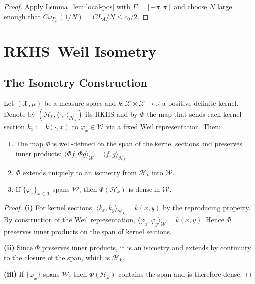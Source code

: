 \begin{proof}
Apply Lemma~\ref{lem:local-pos} with $\Gamma = [-\pi, \pi]$ and choose $N$ large enough that $C \omega_{P_A}(1/N) = C L_A / N \leq c_0/2$.
\end{proof}

\section{RKHS--Weil Isometry}\label{app:rkhs-weil}

\subsection{The Isometry Construction}

\begin{lemma}\label{lem:rkhs-weil-iso}
Let $(\mathcal{X}, \mu)$ be a measure space and $k: \mathcal{X} \times \mathcal{X} \to \mathbb{R}$ a positive-definite kernel. Denote by $(\mathcal{H}_k, \langle \cdot, \cdot \rangle_{\mathcal{H}_k})$ its RKHS and by $\Phi$ the map that sends each kernel section $k_x := k(\cdot, x)$ to $\varphi_x \in \mathcal{W}$ via a fixed Weil representation. Then:
\begin{enumerate}
  \item[\textup{(i)}] The map $\Phi$ is well-defined on the span of the kernel sections and preserves inner products: $\langle \Phi f, \Phi g \rangle_{\mathcal{W}} = \langle f, g \rangle_{\mathcal{H}_k}$.
  \item[\textup{(ii)}] $\Phi$ extends uniquely to an isometry from $\mathcal{H}_k$ into $\mathcal{W}$.
  \item[\textup{(iii)}] If $\{\varphi_x\}_{x \in \mathcal{X}}$ spans $\mathcal{W}$, then $\Phi(\mathcal{H}_k)$ is dense in $\mathcal{W}$.
\end{enumerate}
\end{lemma}

\begin{proof}
\textbf{(i)} For kernel sections, $\langle k_x, k_y \rangle_{\mathcal{H}_k} = k(x, y)$ by the reproducing property. By construction of the Weil representation, $\langle \varphi_x, \varphi_y \rangle_{\mathcal{W}} = k(x, y)$. Hence $\Phi$ preserves inner products on the span of kernel sections.

\textbf{(ii)} Since $\Phi$ preserves inner products, it is an isometry and extends by continuity to the closure of the span, which is $\mathcal{H}_k$.

\textbf{(iii)} If $\{\varphi_x\}$ spans $\mathcal{W}$, then $\Phi(\mathcal{H}_k)$ contains the span and is therefore dense.
\end{proof}

